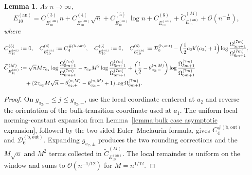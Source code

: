 \documentclass[a4paper]{article}
\newtheorem{lemma}[theorem]{Lemma}
\numberwithin{equation}{section}
\begin{document}
\begin{lemma}\label{lemma:asymptotic expansion E10 annulus}
As $n\to\infty$,
\[
 E_{10}^{(\mathrm{an})}
 =
 C_{E_{10}^{(\mathrm{an})}}^{(3)}n 
 + C_{E_{10}^{(\mathrm{an})}}^{(4)} \sqrt{n} 
 + C_{E_{10}^{(\mathrm{an})}}^{(5)}\log n
 + C_{E_{10}^{(\mathrm{an})}}^{(6)} 
 + \widetilde{C}_{E_{10}^{(\mathrm{an})}}^{(M)} 
 + \mathcal{O}(n^{-\frac{1}{12}}), 
\]
where    
\begin{align*}
C_{E_{10}^{(\mathrm{an})}}^{(3)}
&:=0, 
\quad
C_{E_{10}^{(\mathrm{an})}}^{(4)}
:=C_4^{\#(\mathrm{b,out})},
\quad
C_{E_{10}^{(\mathrm{an})}}^{(5)}
:=0,
\quad
C_{E_{10}^{(\mathrm{an})}}^{(6)}
:=
\mathcal{D}_6^{(\mathrm{b},\mathrm{out})}
-
\Bigl( 
\frac{1}{2}a_2\mathsf{k}'(a_2)+1
\Bigr)
\log\frac{\Omega_{5m+1}^{(7m)}}{\Omega_{6m+1}^{(7m)}}, 
\\
\widetilde{C}_{E_{10}^{(\mathrm{an})}}^{(M)} 
&:=
\sqrt{n}M\tau_{a_2}\log\frac{\Omega_{5m+1}^{(7m)}}{\Omega_{6m+1}^{(7m)}}
-
\tau_{a_2}M^2
\log\frac{\Omega_{5m+1}^{(7m)}}{\Omega_{6m+1}^{(7m)}}
+ \bigg( \frac{1}{2}-\theta_{a_2,-}^{(n,M)} \bigg)\log\frac{\Omega_{5m+1}^{(7m)}}{\Omega_{6m+1}^{(7m)}}
\\
&\quad
+
(2\tau_{a_2}M\sqrt{n}-\theta_{a_2,+}^{(n,M)}-\theta_{a_2,-}^{(n,M)}+1)\log \Omega_{6m+1}^{(7m)}.
\end{align*} 

\end{lemma}


\begin{proof}
On $g_{a_2,-}\le j\le g_{a_2,+}$, use the local coordinate centered at
$a_2$ and reverse the orientation of the bulk-transition coordinate used at
$a_1$.  The uniform local norming-constant expansion from
Lemma~\ref{lemma:bulk case asymptotic expansion}, followed by the two-sided
Euler--Maclaurin formula, gives $C_4^{\#(\mathrm{b,out})}$ and
$\mathcal D_6^{(\mathrm{b,out})}$.  Expanding $g_{a_2,\pm}$ produces the two
rounding corrections and the $M\sqrt n$ and $M^2$ terms collected in
$\widetilde C_{E_{10}^{(\mathrm{an})}}^{(M)}$.  The local remainder is uniform
on the window and sums to $\mathcal O(n^{-1/12})$ for $M=n^{1/12}$.
\end{proof}
\end{document}
